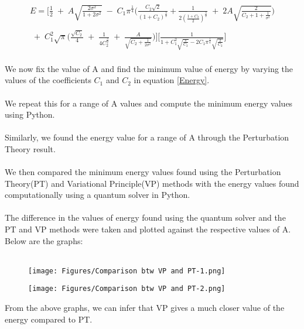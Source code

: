 \documentclass[12pt]{article}
\begin{document}
\newpage

\begin{equation}
\begin{split}
   E = \Big[ \frac{1}{2} \;+\; A \sqrt{\frac{2\sigma^2}{1 + 2\sigma^2}} \;-\; C_1 \pi^\frac{1}{4} \big( 
   \frac{C_2 \sqrt{2}}{(1 + C_2)^\frac{3}{2}} + \frac{1}{2 (\frac{1 + C_2}{2})^\frac{3}{2}} \;+\; 2A \sqrt{\frac{2}{C_2 + 1 + \frac{1}{\sigma^2}}} \big) 
   \\
    \\
    \;+\; C_1^2 \sqrt{\pi} \big(\frac{\sqrt{C_2}}{4} \;+\; \frac{1}{4 C_2^\frac{3}{2}} \;+\; \frac{A}{\sqrt{C_2 + 
    \frac{1}{2 \sigma^2}}}\big) \Big]  \Big[ \frac{1}{1 + C_1^2 \sqrt{\frac{\pi}{C_2}} - 2C_1 \pi^\frac{1}{4} \sqrt{\frac{2}{C_2}}} \Big]
\end{split}
\label{Energy}
\end{equation}
\\
We now fix the value of A and find the minimum value of energy by varying the values of the coefficients $C_1$ and $C_2$ in equation \ref{Energy}. 
\\
\\
We repeat this for a range of A values and compute the minimum energy values using Python.
\\
\\
Similarly, we found the energy value for a range of A through the Perturbation Theory result.
\\
\\
We then compared the minimum energy values found using the Perturbation Theory(PT) and Variational Principle(VP) 
methods with the energy values found computationally using a quantum solver in Python. 
\\
\\
The difference in the values of energy found using the quantum solver and the PT and VP methods were taken and 
plotted against the respective values of A. Below are the graphs: 
\\
\\
\begin{figure}[h]
    \centering
    \texttt{[image: Figures/Comparison btw VP and PT-1.png]}
\end{figure}

\newpage

\begin{figure}[h]
    \centering
    \texttt{[image: Figures/Comparison btw VP and PT-2.png]}
\end{figure}


From the above graphs, we can infer that VP gives a much closer value of the energy compared to PT. 
\end{document}
